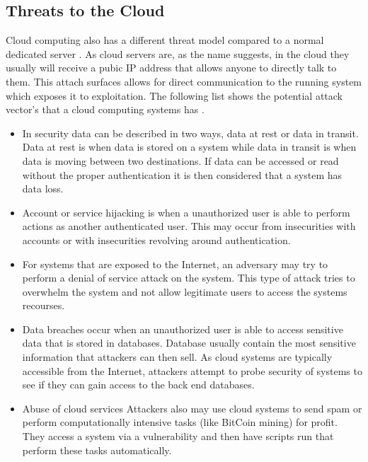 \documentclass[12pt]{article}
\begin{document}
\subsection{Threats to the Cloud}
Cloud computing also has a different threat model compared to a normal dedicated server \cite{zissis2012addressing, mishra2013cloud, krutz2010cloud}. As cloud servers are, as the name suggests, in the cloud they usually will receive a pubic IP address that allows anyone to directly talk to them. This attach surfaces allows for direct communication to the running system which exposes it to exploitation. The following list shows the potential attack vector's that a cloud computing systems has \cite{amini2015threat}.

\begin{itemize}
    \item In security data can be described in two ways, data at rest or data in transit. Data at rest is when data is stored on a system while data in transit is when data is moving between two destinations. If data can be accessed or read without the proper authentication it is then considered that a system has data loss. 
    \item Account or service hijacking is when a unauthorized user is able to perform actions as another authenticated user. This may occur from insecurities with accounts or with insecurities revolving around authentication. 
    \item For systems that are exposed to the Internet, an adversary may try to perform a denial of service attack on the system. This type of attack tries to overwhelm the system and not allow legitimate users to access the systems recourses. 
    \item Data breaches occur when an unauthorized user is able to access sensitive data that is stored in databases. Database usually contain the most sensitive information that attackers can then sell. As cloud systems are typically accessible from the Internet, attackers attempt to probe security of systems to see if they can gain access to the back end databases. 
    \item Abuse of cloud services Attackers also may use cloud systems to send spam or perform computationally intensive tasks (like BitCoin mining) for profit. They access a system via a vulnerability and then have scripts run that perform these tasks automatically. 
\end{itemize}
\end{document}
